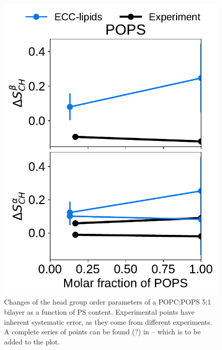 \documentclass[journal=jpcbfk,manuscript=article]{achemso}
\newlength{\figwidth}
\begin{document}
\begin{figure}[htb!]
  \includegraphics[width=\figwidth]{../Fig/l17/order_parameters_changes_A-B_PC-PS_mix_POPS_nacl.pdf} 
  \caption{\label{fig:delta_ordPar_NaCl_PC-PS_mix_l17} 
    Changes of the head group order parameters of a POPC:POPS 5:1 bilayer as a function of PS content.
    Experimental points have inherent systematic error, as they come from different experiments.
    A complete series of points can be found (?) in \cite{roux90} -- which is to be added to the plot.
  } 
\end{figure} 
 
\end{document}
